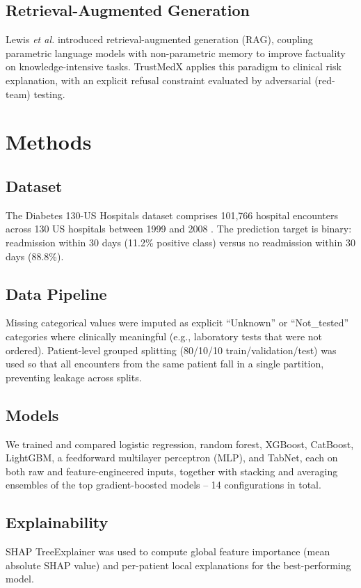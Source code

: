 \documentclass[12pt,onecolumn,journal]{IEEEtran}
\begin{document}
\subsection{Retrieval-Augmented Generation}
Lewis \emph{et al.} \cite{lewis2020retrieval} introduced retrieval-augmented generation (RAG), coupling parametric language models with non-parametric memory to improve factuality on knowledge-intensive tasks. TrustMedX applies this paradigm to clinical risk explanation, with an explicit refusal constraint evaluated by adversarial (red-team) testing.

\section{Methods}
\label{sec:methods}

\subsection{Dataset}
The Diabetes 130-US Hospitals dataset comprises 101,766 hospital encounters across 130 US hospitals between 1999 and 2008 \cite{strack2014impact}. The prediction target is binary: readmission within 30 days (11.2\% positive class) versus no readmission within 30 days (88.8\%).

\subsection{Data Pipeline}
Missing categorical values were imputed as explicit ``Unknown'' or ``Not\_tested'' categories where clinically meaningful (e.g., laboratory tests that were not ordered). Patient-level grouped splitting (80/10/10 train/validation/test) was used so that all encounters from the same patient fall in a single partition, preventing leakage across splits.

\subsection{Models}
We trained and compared logistic regression, random forest, XGBoost, CatBoost, LightGBM, a feedforward multilayer perceptron (MLP), and TabNet, each on both raw and feature-engineered inputs, together with stacking and averaging ensembles of the top gradient-boosted models -- 14 configurations in total.

\subsection{Explainability}
SHAP TreeExplainer \cite{lundberg2017unified} was used to compute global feature importance (mean absolute SHAP value) and per-patient local explanations for the best-performing model.
\end{document}
